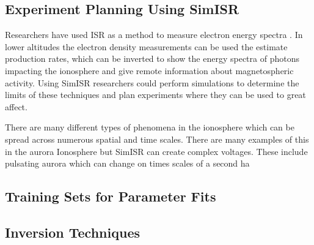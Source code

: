 \subsection{Experiment Planning Using SimISR}

Researchers have used ISR as a method to measure electron energy spectra \cite{Semeter:2005foa}. In lower altitudes the electron density measurements can be used the estimate production rates, which can be inverted to show the energy spectra of photons impacting the ionosphere and give remote information about magnetospheric activity. Using SimISR researchers could perform simulations to determine the limits of these techniques and plan experiments where they can be used to great affect.

There are many different types of phenomena in the ionosphere which can be spread across numerous spatial and time scales. There are many examples of this in the aurora Ionosphere but SimISR can create complex voltages. These include pulsating aurora which can change on times scales of a second ha 


\subsection{Training Sets for Parameter Fits}

\subsection{Inversion Techniques}
